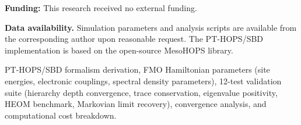 \documentclass[journal=jpcl,manuscript=letter]{achemso}
\begin{document}
\vspace{1ex}
\noindent\textbf{Funding:} This research received no external funding.


\textbf{Data availability.} Simulation parameters and analysis scripts are available from the corresponding author upon reasonable request. The PT-HOPS/SBD implementation is based on the open-source MesoHOPS library.


\begin{suppinfo}
PT-HOPS/SBD formalism derivation, FMO Hamiltonian parameters (site energies, electronic couplings, spectral density parameters), 12-test validation suite (hierarchy depth convergence, trace conservation, eigenvalue positivity, HEOM benchmark, Markovian limit recovery), convergence analysis, and computational cost breakdown.
\end{suppinfo}



\end{document}
